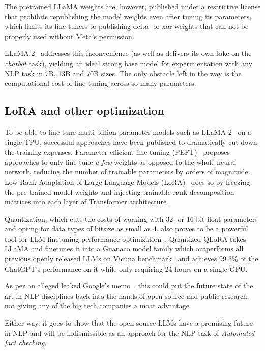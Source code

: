 The pretrained LLaMA weights are, however, published under a restrictive license that prohibits republishing the model weights even after tuning its parameters, which limits its fine-tuners to publishing delta- or xor-weights that can not be properly used without \textsf{Meta}'s permission.

LLaMA-2~\cite{llama2} addresses this inconvenience (as well as delivers its own take on the \textit{chatbot} task), yielding an ideal strong base model for experimentation with any NLP task in 7B, 13B and 70B sizes.
The only obstacle left in the way is the computational cost of fine-tuning across so many parameters.


\subsection{LoRA and other optimization}\label{sec:lora}
To be able to fine-tune multi-billion-parameter models such as \textsf{LLaMA-2}~\cite{llama2} on a single TPU, successful approaches have been published to dramatically cut-down the training expenses.
Parameter-efficient fine-tuning (PEFT)~\cite{peft} proposes approaches to only fine-tune \textit{a few} weights as opposed to the whole neural network, reducing the number of trainable parameters by orders of magnitude.
Low-Rank Adaptation of Large Language Models (LoRA)~\cite{lora} does so by freezing the pre-trained model weights and injecting trainable rank decomposition matrices into each layer of Transformer architecture. 

Quantization, which cuts the costs of working with 32- or 16-bit float parameters and opting for data types of bitsize as small as 4, also proves to be a powerful tool for LLM finetuning performance optimization~\cite{dettmers2023qlora}.
Quantized QLoRA takes LLaMA and finetunes it into a Guanaco model family which outperforms all previous openly released LLMs on Vicuna benchmark~\cite{dettmers2023qlora} and achieves 99.3\% of the ChatGPT's performance on it while only requiring 24 hours on a single GPU.

As per an alleged leaked Google's memo~\cite{moat}, this could put the future state of the art in NLP disciplines back into the hands of open source and public research, not giving any of the big tech companies a \"{moat} advantage.

Either way, it goes to show that the open-source LLMs have a promising future in NLP and will be indismissible as an approach for the NLP task of \textit{Automated fact checking}.

